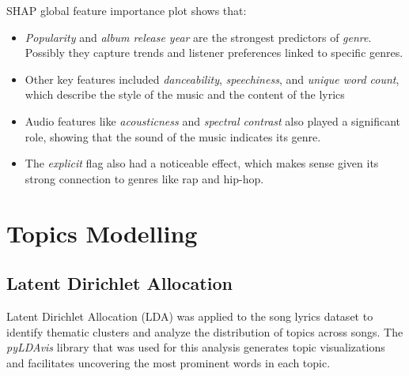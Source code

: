 SHAP global feature importance plot shows that:
\begin{itemize}
  \item \textit{Popularity} and \textit{album release year} are the strongest
    predictors of \textit{genre}.  Possibly they capture trends and listener
    preferences linked to specific genres.  
  \item Other key features included \textit{danceability},
    \textit{speechiness}, and \textit{unique word count}, which describe the
    style of the music and the content of the lyrics
  \item Audio features like \textit{acousticness} and
    \textit{spectral contrast} also played a significant role, showing
    that the sound of the music indicates its genre. 
  \item The \textit{explicit} flag also had a noticeable effect, which makes
    sense given its strong connection to genres like rap and hip-hop.

\end{itemize}



\section{Topics Modelling}
\label{sec:topicsmodelling}

\subsection{Latent Dirichlet Allocation}

Latent Dirichlet Allocation (LDA) was applied to the song lyrics dataset to
identify thematic clusters and analyze the distribution of topics across songs.
The \textit{pyLDAvis} library that was used for this analysis generates topic
visualizations and facilitates uncovering the most prominent words in each
topic.\cite{pylda}

